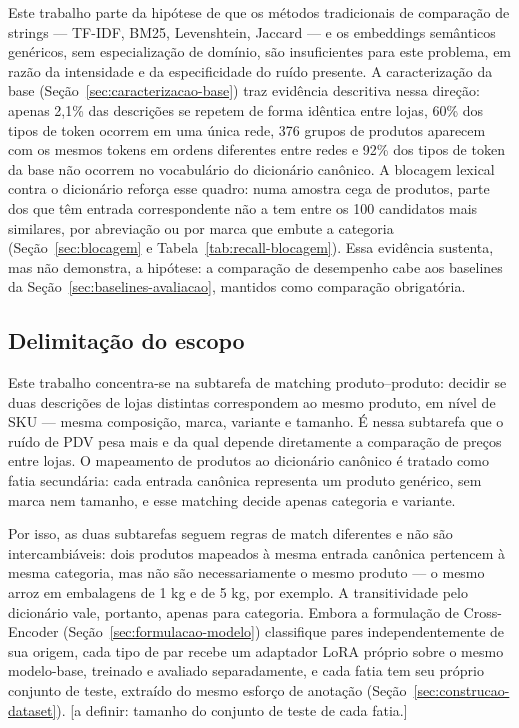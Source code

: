 \documentclass[
    article,
    12pt,
    oneside,
    a4paper,
    english,
    brazilian
    ]{abntex2}
\numberwithin{equation}{section}
\begin{document}
Este trabalho parte da hipótese de que os métodos tradicionais de comparação de strings --- TF-IDF, BM25, Levenshtein, Jaccard --- e os embeddings semânticos genéricos, sem especialização de domínio, são insuficientes para este problema, em razão da intensidade e da especificidade do ruído presente. A caracterização da base (Seção~\ref{sec:caracterizacao-base}) traz evidência descritiva nessa direção: apenas 2,1\% das descrições se repetem de forma idêntica entre lojas, 60\% dos tipos de token ocorrem em uma única rede, 376 grupos de produtos aparecem com os mesmos tokens em ordens diferentes entre redes e 92\% dos tipos de token da base não ocorrem no vocabulário do dicionário canônico. A blocagem lexical contra o dicionário reforça esse quadro: numa amostra cega de produtos, parte dos que têm entrada correspondente não a tem entre os 100 candidatos mais similares, por abreviação ou por marca que embute a categoria (Seção~\ref{sec:blocagem} e Tabela~\ref{tab:recall-blocagem}). Essa evidência sustenta, mas não demonstra, a hipótese: a comparação de desempenho cabe aos baselines da Seção~\ref{sec:baselines-avaliacao}, mantidos como comparação obrigatória.

\subsection{Delimitação do escopo}
\label{sec:delimitacao-escopo}

Este trabalho concentra-se na subtarefa de matching produto--produto: decidir se duas descrições de lojas distintas correspondem ao mesmo produto, em nível de SKU --- mesma composição, marca, variante e tamanho. É nessa subtarefa que o ruído de PDV pesa mais e da qual depende diretamente a comparação de preços entre lojas. O mapeamento de produtos ao dicionário canônico é tratado como fatia secundária: cada entrada canônica representa um produto genérico, sem marca nem tamanho, e esse matching decide apenas categoria e variante.

Por isso, as duas subtarefas seguem regras de match diferentes e não são intercambiáveis: dois produtos mapeados à mesma entrada canônica pertencem à mesma categoria, mas não são necessariamente o mesmo produto --- o mesmo arroz em embalagens de 1 kg e de 5 kg, por exemplo. A transitividade pelo dicionário vale, portanto, apenas para categoria. Embora a formulação de Cross-Encoder (Seção~\ref{sec:formulacao-modelo}) classifique pares independentemente de sua origem, cada tipo de par recebe um adaptador LoRA próprio sobre o mesmo modelo-base, treinado e avaliado separadamente, e cada fatia tem seu próprio conjunto de teste, extraído do mesmo esforço de anotação (Seção~\ref{sec:construcao-dataset}). [a definir: tamanho do conjunto de teste de cada fatia.]
\end{document}
